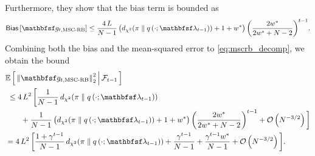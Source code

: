 \begin{proofEnd}
  Furthermore, they show that the bias term is bounded as
  \begin{align*}
    \mathsf{Bias}\left[ \rvvg_{t,\text{MSC-RB}} \right]
    \leq
    \frac{4 \, L}{N-1} \left( \DChi{\pi}{q\left(\cdot; \rvvlambda_{t-1}\right)} + 1 + w^*\right) {\left( \frac{2 w^*}{ 2 w^* + N - 2 } \right)}^{t-1}.
  \end{align*}
  Combining both the bias and the mean-squared error to \cref{eq:mscrb_decomp}, we obtain the bound
  \begin{align*}
    &\E{ {\lVert \rvvg_{t,\text{MSC-RB}} \rVert}_2^2 \,\middle|\, \mathcal{F}_{t-1} }
    \\
    &\;\leq 
    4\,L^2\,\bigg[
    \frac{1}{N-1}\,\DChi{\pi}{q\left(\cdot; \rvvlambda_{t-1}\right)}
    \\
    &\qquad+
    \frac{1}{N-1} \left( \DChi{\pi}{q\left(\cdot; \rvvlambda_{t-1}\right)} + 1 + w^*\right) {\left( \frac{2 w^*}{ 2 w^* + N - 2 } \right)}^{t-1}
    +
    \mathcal{O}\left(N^{-3/2}\right)
    \bigg]
    \\
    &=
    4 \, L^2 \,\bigg[
    \frac{1 + \gamma^{t-1}}{N-1}\,\DChi{\pi}{q\left(\cdot; \rvvlambda_{t-1}\right)} + \frac{\gamma^{t-1}}{N-1} + \frac{\gamma^{t-1} w^*}{N-1}
    +
    \mathcal{O}\left(N^{-3/2}\right)
    \bigg].
  \end{align*}
\end{proofEnd}

